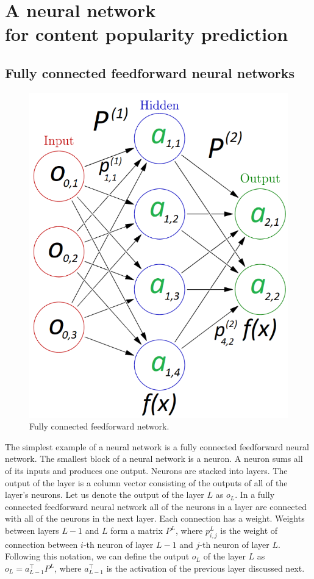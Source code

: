\section{A neural network \\ for content popularity prediction} \label{neural_network}

\subsection{Fully connected feedforward neural networks} \label{feedforward_nn}

\begin{figure}[b!]
	\centering
	\includegraphics[totalheight=7cm]{pics/nn_1.png}
	\caption{Fully connected feedforward network.}
	\label{fig:nn1}
\end{figure}

The simplest example of a neural network is a fully connected feedforward neural network. The smallest block of a neural network is a neuron. A neuron sums all of its inputs and produces one output. Neurons are stacked into layers. The output of the layer is a column vector consisting of the outputs of all of the layer's neurons. Let us denote the output of the layer $L$ as $o_L$. In a fully connected feedforward neural network all of the neurons in a layer are connected with all of the neurons in the next layer. Each connection has a weight. Weights between layers $ L - 1 $ and $ L  $ form a matrix $ P^L $, where $ p^{L}_{i,j}$ is the weight of connection between $i$-th neuron  of layer $L - 1$ and $j$-th neuron of layer $L$. Following this notation, we can define the output $o_L$ of the layer $L$ as $o_L = a^{\intercal}_{L-1} P^L$, where $a^{\intercal}_{L-1}$ is the activation of the previous layer discussed next.

